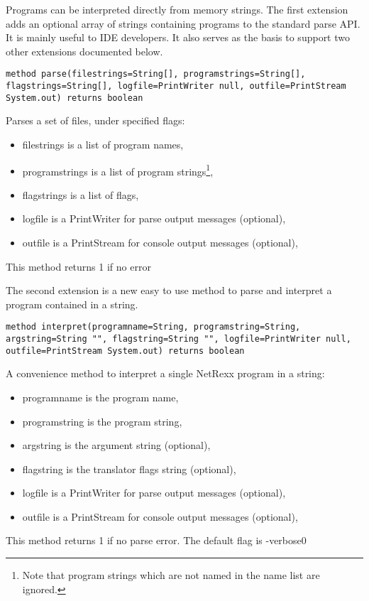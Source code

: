Programs can be interpreted directly from memory
strings. The first extension adds an optional array of strings containing programs to the standard parse API. It is mainly useful to IDE developers. It also serves as the basis to support two other extensions documented below.
\begin{lstlisting}[label=memorystrings,caption=parse program in
  memory buffer]
method parse(filestrings=String[], programstrings=String[], flagstrings=String[], logfile=PrintWriter null, outfile=PrintStream System.out) returns boolean
\end{lstlisting}

Parses a set of files, under specified flags:
\begin{itemize}
\item filestrings is a list of program names,
\item programstrings is a list of program strings\footnote{Note that program strings which are not named in the name list are ignored.},
\item flagstrings is a list of flags,
\item logfile is a PrintWriter for parse output messages (optional),
\item outfile is a PrintStream for console output messages (optional),
\end{itemize}
This method returns 1 if no error


The second extension is a new easy to use method to parse and interpret a program contained in a string.
\begin{lstlisting}[label=memorystrings2,caption=parse program in string]
method interpret(programname=String, programstring=String, argstring=String "", flagstring=String "", logfile=PrintWriter null, outfile=PrintStream System.out) returns boolean
\end{lstlisting}
A convenience method to interpret a single NetRexx program in a string:
\begin{itemize}
\item programname is the program name,
\item programstring is the program string,
\item argstring is the argument string (optional),
\item flagstring is the translator flags string (optional),
\item logfile is a PrintWriter for parse output messages (optional),
\item outfile is a PrintStream for console output messages (optional),
\end{itemize}
This method returns 1 if no parse error. The default flag is -verbose0

